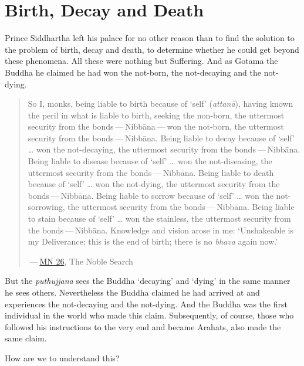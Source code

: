 \chapter{Birth, Decay and Death}

Prince Siddhartha left his palace for no other reason than to find the solution to the problem of birth, decay and death, to determine whether he could get beyond these phenomena. All these were nothing but Suffering. And as Gotama the Buddha he claimed he had won the not-born, the not-decaying and the not-dying.

\begin{quote}
So I, monks, being liable to birth because of `self' (\emph{attanā}), having known the peril in what is liable to birth, seeking the non-born, the uttermost security from the bonds --- Nibbāna --- won the not-born, the uttermost security from the bonds --- Nibbāna. Being liable to decay because of `self' \ldots\hspace{0pt} won the not-decaying, the uttermost security from the bonds --- Nibbāna. Being liable to disease because of `self' \ldots\hspace{0pt} won the not-diseasing, the uttermost security from the bonds --- Nibbāna. Being liable to death because of `self' \ldots\hspace{0pt} won the not-dying, the uttermost security from the bonds --- Nibbāna. Being liable to sorrow because of `self' \ldots\hspace{0pt} won the not-sorrowing, the uttermost security from the bonds --- Nibbāna. Being liable to stain because of `self' \ldots\hspace{0pt} won the stainless, the uttermost security from the bonds --- Nibbāna. Knowledge and vision arose in me: `Unshakeable is my Deliverance; this is the end of birth; there is no \emph{bhava} again now.'

 --- \href{https://suttacentral.net/mn26/en/bodhi}{MN 26}, The Noble Search
\end{quote}

But the \emph{puthujjana} sees the Buddha `decaying' and `dying' in the same manner he sees others. Nevertheless the Buddha claimed he had arrived at and experiences the not-decaying and the not-dying. And the Buddha was the first individual in the world who made this claim. Subsequently, of course, those who followed his instructions to the very end and became Arahats, also made the same claim.

How are we to understand this?

